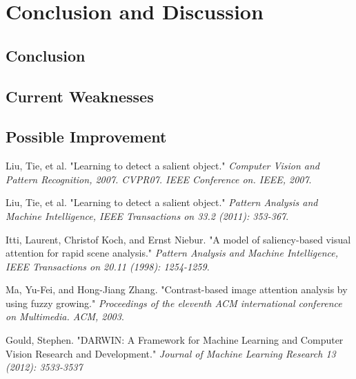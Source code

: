 \documentclass[10pt,twocolumn,letterpaper]{article}
\begin{document}
\section{Conclusion and Discussion}
\subsection{Conclusion}
\subsection{Current Weaknesses}
\subsection{Possible Improvement}

\begin{thebibliography}{99} \fontsize{9pt}{50} \setlength{\itemsep}{-0.5pt} 
     Liu, Tie, et al. "Learning to detect a salient object." 
        \textit{Computer Vision and Pattern Recognition, 2007. CVPR07. IEEE Conference on. IEEE, 2007}.

     Liu, Tie, et al. "Learning to detect a salient object." 
        \textit{Pattern Analysis and Machine Intelligence, IEEE Transactions on 33.2 (2011): 353-367}. 

     Itti, Laurent, Christof Koch, and Ernst Niebur. "A model of saliency-based visual attention for rapid scene analysis."
        \textit{Pattern Analysis and Machine Intelligence, IEEE Transactions on 20.11 (1998): 1254-1259}.

     Ma, Yu-Fei, and Hong-Jiang Zhang. "Contrast-based image attention analysis by using fuzzy growing."
        \textit{ Proceedings of the eleventh ACM international conference on Multimedia. ACM, 2003}. 

     Gould, Stephen. "DARWIN: A Framework for Machine Learning and Computer Vision Research and Development." 
        \textit{Journal of Machine Learning Research 13 (2012): 3533-3537}

\end{thebibliography}
\end{document}

